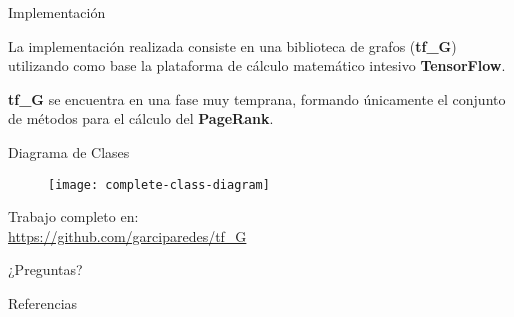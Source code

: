 \documentclass[12pt]{beamer}
\begin{document}
    \begin{frame}[fragile]{Implementación}

      La implementación realizada consiste en una biblioteca de grafos (\textbf{tf\_G}) utilizando como base la plataforma de cálculo matemático intesivo \textbf{TensorFlow}.

      \textbf{tf\_G} se encuentra en una fase muy temprana, formando únicamente el conjunto de métodos para el cálculo del \textbf{PageRank}.

    \end{frame}

    \begin{frame}[fragile]{Diagrama de Clases}

      \begin{figure}
        \texttt{[image: complete-class-diagram]}
        \caption{}
        \label{}
      \end{figure}

    \end{frame}


    \begin{frame}[standout]
      Trabajo completo en: \\
      \small\url{https://github.com/garciparedes/tf_G}
    \end{frame}

  \begin{frame}[standout]
    ¿Preguntas?
  \end{frame}


  \begin{frame}[allowframebreaks]{Referencias}

    
    

  \end{frame}
\end{document}
